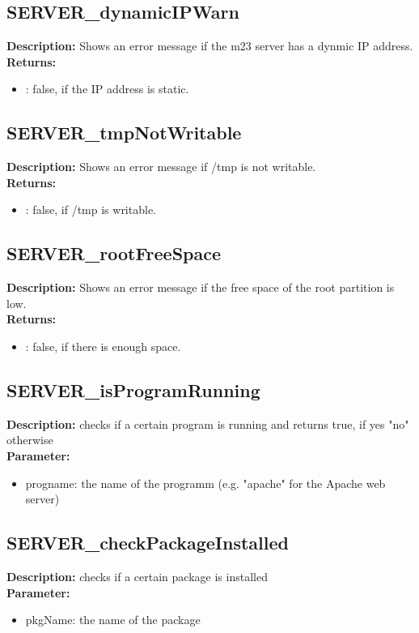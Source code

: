 \subsection{SERVER\_dynamicIPWarn}
\textbf{Description:} Shows an error message if the m23 server has a dynmic IP address.\\
\textbf{Returns:}
\begin{itemize}
\item : false, if the IP address is static.
\end{itemize}

\subsection{SERVER\_tmpNotWritable}
\textbf{Description:} Shows an error message if /tmp is not writable.\\
\textbf{Returns:}
\begin{itemize}
\item : false, if /tmp is writable.
\end{itemize}

\subsection{SERVER\_rootFreeSpace}
\textbf{Description:} Shows an error message if the free space of the root partition is low.\\
\textbf{Returns:}
\begin{itemize}
\item : false, if there is enough space.
\end{itemize}

\subsection{SERVER\_isProgramRunning}
\textbf{Description:} checks if a certain program is running and returns true, if yes "no" otherwise\\
\textbf{Parameter:}
\begin{itemize}
\item progname: the name of the programm (e.g. "apache" for the Apache web server)
\end{itemize}

\subsection{SERVER\_checkPackageInstalled}
\textbf{Description:} checks if a certain package is installed\\
\textbf{Parameter:}
\begin{itemize}
\item pkgName: the name of the package
\end{itemize}

